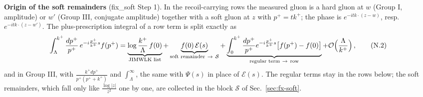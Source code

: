 \documentclass[9pt]{article}
\numberwithin{equation}{section}
\begin{document}
{\noindent\textbf{Origin of the soft remainders} (fix\_soft Step 1). In the recoil-carrying rows the measured gluon is a hard gluon at $w$ (Group I, amplitude) or $w'$ (Group III, conjugate amplitude) together with a soft gluon at $z$ with $p^{+}=tk^{+}$; the phase is $e^{-itk\cdot(z-w)}$, resp.\ $e^{-itk\cdot(z-w')}$. The plus-prescription integral of a row term is split exactly as
\begin{align}
\int_{\Lambda}^{k^{+}}\frac{dp^{+}}{p^{+}}\,e^{-i\frac{p^{+}}{k^{+}}s}f(p^{+})=\underbrace{\log\frac{k^{+}}{\Lambda}\,f(0)}_{\text{JIMWLK list}}+\underbrace{f(0)\,\mathcal{E}(s)}_{\text{soft remainder}\ \to\ \mathcal{S}}+\underbrace{\int_{0}^{k^{+}}\frac{dp^{+}}{p^{+}}e^{-i\frac{p^{+}}{k^{+}}s}\big[f(p^{+})-f(0)\big]}_{\text{regular term}\ \to\ \text{row}}+{\cal O}\Big(\frac{\Lambda}{k^{+}}\Big)\,,\tag{N.2}\label{eq:fx-split}
\end{align}
and in Group III, with $\frac{k^{+}dp^{+}}{p^{+}(p^{+}+k^{+})}$ and $\int_{\Lambda}^{\infty}$, the same with $\Psi(s)$ in place of $\mathcal{E}(s)$. The regular terms stay in the rows below; the soft remainders, which fall only like $\frac{\log|z|}{z^{2}}$ one by one, are collected in the block $\mathcal{S}$ of Sec.~\ref{sec:fx-soft}.}\par
\end{document}
